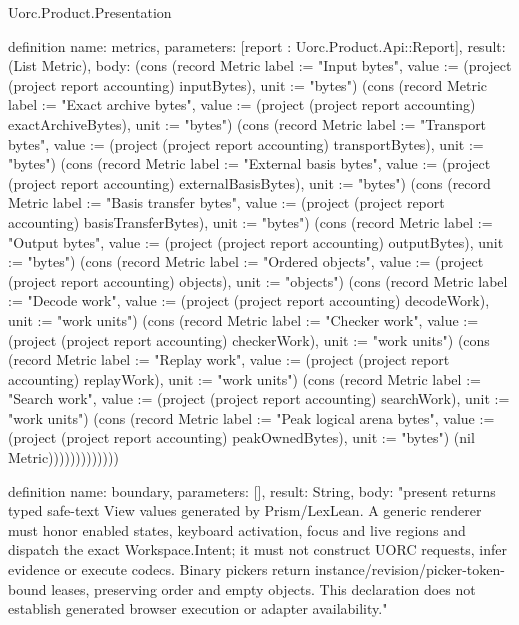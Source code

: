 \begin{lexlean}{Uorc.Product.Presentation}
\begin{semanticmodule}
definition{
  name: metrics,
  parameters: [report : Uorc.Product.Api::Report],
  result: (List Metric),
  body: (cons (record Metric {label := "Input bytes", value := (project (project report accounting) inputBytes), unit := "bytes"}) (cons (record Metric {label := "Exact archive bytes", value := (project (project report accounting) exactArchiveBytes), unit := "bytes"}) (cons (record Metric {label := "Transport bytes", value := (project (project report accounting) transportBytes), unit := "bytes"}) (cons (record Metric {label := "External basis bytes", value := (project (project report accounting) externalBasisBytes), unit := "bytes"}) (cons (record Metric {label := "Basis transfer bytes", value := (project (project report accounting) basisTransferBytes), unit := "bytes"}) (cons (record Metric {label := "Output bytes", value := (project (project report accounting) outputBytes), unit := "bytes"}) (cons (record Metric {label := "Ordered objects", value := (project (project report accounting) objects), unit := "objects"}) (cons (record Metric {label := "Decode work", value := (project (project report accounting) decodeWork), unit := "work units"}) (cons (record Metric {label := "Checker work", value := (project (project report accounting) checkerWork), unit := "work units"}) (cons (record Metric {label := "Replay work", value := (project (project report accounting) replayWork), unit := "work units"}) (cons (record Metric {label := "Search work", value := (project (project report accounting) searchWork), unit := "work units"}) (cons (record Metric {label := "Peak logical arena bytes", value := (project (project report accounting) peakOwnedBytes), unit := "bytes"}) (nil Metric)))))))))))))
}

definition{
  name: boundary,
  parameters: [],
  result: String,
  body: "present returns typed safe-text View values generated by Prism/LexLean. A generic renderer must honor enabled states, keyboard activation, focus and live regions and dispatch the exact Workspace.Intent; it must not construct UORC requests, infer evidence or execute codecs. Binary pickers return instance/revision/picker-token-bound leases, preserving order and empty objects. This declaration does not establish generated browser execution or adapter availability."
}


\end{semanticmodule}
\end{lexlean}
